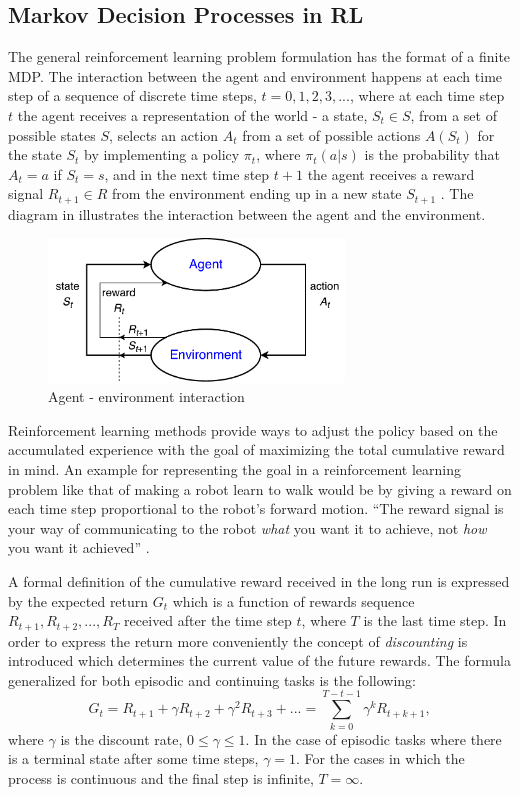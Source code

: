 \subsection{Markov Decision Processes in RL}
The general reinforcement learning problem formulation has the format of a finite MDP. The interaction between the agent and environment happens at each time step of a sequence of discrete time steps, $t=0,1,2,3,...$, where at each time step $t$ the agent receives a representation of the world - a state, $S_{t}\in S$, from a set of possible states $S$, selects an action $A_{t}$ from a set of possible actions $A(S_{t})$ for the state $S_{t}$ by implementing a policy $\pi_{t}$, where $\pi_{t}(a|s)$ is the probability that $A_{t}=a$ if $S_{t}=s$, and in the next time step $t+1$ the agent receives a reward signal $R_{t+1}\in R$ from the environment ending up in a new state $S_{t+1}$ \cite{Sutton}. The diagram in  illustrates the interaction between the agent and the environment.
\begin{figure}[H]
	\centering
	\includegraphics[width=0.7\textwidth]{Figures/Agent-EnvironmentInteraction}
	\caption{Agent - environment interaction}
	\label{fig:AgentEnv}
\end{figure}
Reinforcement learning methods provide ways to adjust the policy based on the accumulated experience with the goal of maximizing the total cumulative reward in mind. An example for representing the goal in a reinforcement learning problem like that of making a robot learn to walk would be by giving a reward on each time step proportional to the robot's forward motion. “The reward signal is your way of communicating to the robot \textit{what} you want it to achieve, not \textit{how} you want it achieved” \cite{Sutton}.

A formal definition of the cumulative reward received in the long run is expressed by the expected return $G_{t}$ which is a function of rewards sequence $R_{t+1},R_{t+2},...,R_{T}$ received after the time step $t$, where $T$ is the last time step. In order to express the return more conveniently the concept of \textit{discounting} is introduced which determines the current value of the future rewards. The formula generalized for both episodic and continuing tasks is the following: 
\begin{equation}
G_{t}=R_{t+1}+\gamma R_{t+2}+\gamma ^2R_{t+3}+...=\sum_{k=0}^{T-t-1}\gamma ^kR_{t+k+1}, 
\end{equation}
where $\gamma$ is the discount rate, $0\leq \gamma\leq1$. In the case of episodic tasks where there is a terminal state after some time steps, $\gamma=1$. For the cases in which the process is continuous and the final step is infinite, $T=\infty$. 

